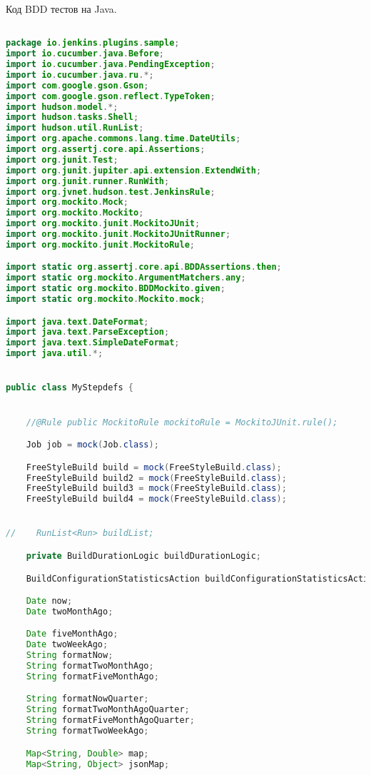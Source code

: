 Код BDD тестов на Java.

\begin{lstlisting}[language=Java]

package io.jenkins.plugins.sample;
import io.cucumber.java.Before;
import io.cucumber.java.PendingException;
import io.cucumber.java.ru.*;
import com.google.gson.Gson;
import com.google.gson.reflect.TypeToken;
import hudson.model.*;
import hudson.tasks.Shell;
import hudson.util.RunList;
import org.apache.commons.lang.time.DateUtils;
import org.assertj.core.api.Assertions;
import org.junit.Test;
import org.junit.jupiter.api.extension.ExtendWith;
import org.junit.runner.RunWith;
import org.jvnet.hudson.test.JenkinsRule;
import org.mockito.Mock;
import org.mockito.Mockito;
import org.mockito.junit.MockitoJUnit;
import org.mockito.junit.MockitoJUnitRunner;
import org.mockito.junit.MockitoRule;

import static org.assertj.core.api.BDDAssertions.then;
import static org.mockito.ArgumentMatchers.any;
import static org.mockito.BDDMockito.given;
import static org.mockito.Mockito.mock;

import java.text.DateFormat;
import java.text.ParseException;
import java.text.SimpleDateFormat;
import java.util.*;


public class MyStepdefs {


    //@Rule public MockitoRule mockitoRule = MockitoJUnit.rule();

    Job job = mock(Job.class);

    FreeStyleBuild build = mock(FreeStyleBuild.class);
    FreeStyleBuild build2 = mock(FreeStyleBuild.class);
    FreeStyleBuild build3 = mock(FreeStyleBuild.class);
    FreeStyleBuild build4 = mock(FreeStyleBuild.class);


//    RunList<Run> buildList;

    private BuildDurationLogic buildDurationLogic;

    BuildConfigurationStatisticsAction buildConfigurationStatisticsAction;

    Date now;
    Date twoMonthAgo;

    Date fiveMonthAgo;
    Date twoWeekAgo;
    String formatNow;
    String formatTwoMonthAgo;
    String formatFiveMonthAgo;

    String formatNowQuarter;
    String formatTwoMonthAgoQuarter;
    String formatFiveMonthAgoQuarter;
    String formatTwoWeekAgo;

    Map<String, Double> map;
    Map<String, Object> jsonMap;



\end{lstlisting}
